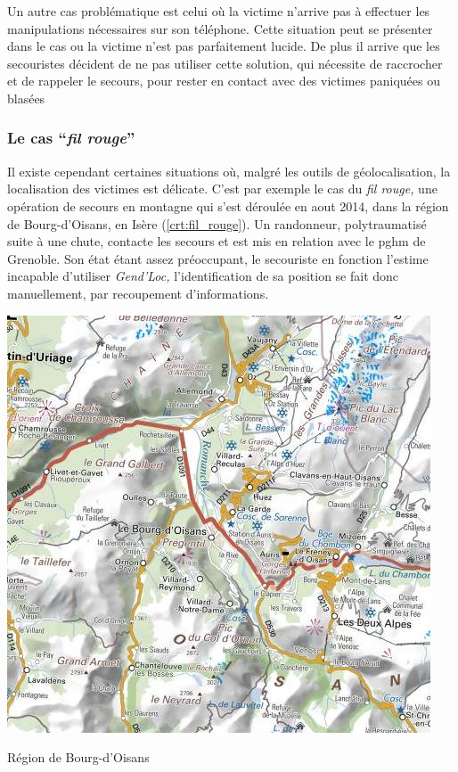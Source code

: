 Un autre cas problématique est celui où la victime n'arrive pas à
effectuer les manipulations nécessaires sur son téléphone. Cette
situation peut se présenter dans le cas ou la victime n'est pas
parfaitement lucide. De plus il arrive que les secouristes décident de
ne pas utiliser cette solution, qui nécessite de raccrocher et de
rappeler le secours, pour rester en contact avec des victimes
paniquées ou blasées

\subsubsection{Le cas \enquote{\emph{fil rouge}}}
\label{subsec:1-1-2-3}

Il existe cependant certaines situations où, malgré les outils de
géolocalisation, la localisation des victimes est délicate. C'est par
exemple le cas du \emph{fil rouge,} une opération de secours en
montagne qui s'est déroulée en aout 2014, dans la région de
Bourg-d'Oisans, en Isère (\autoref{crt:fil_rouge}). Un randonneur,
polytraumatisé suite à une chute, contacte les secours et est mis en
relation avec le \ac{pghm} de Grenoble. Son état étant assez
préoccupant, le secouriste en fonction l'estime incapable d'utiliser
\emph{Gend'Loc,} l'identification de sa position se fait donc
manuellement, par recoupement d'informations.

\begin{carte}
  \centering
  \includegraphics{../figures/bourdOisans.jpg}
  \caption{Région de Bourg-d'Oisans}
  \label{crt:fil_rouge}
\end{carte}

